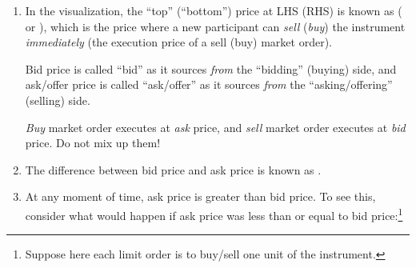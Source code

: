 \begin{enumerate}
\item In the visualization, the ``top'' (``bottom'') price at LHS (RHS) is
known as  ( or ), which is
the price where a new participant  can \emph{sell} (\emph{buy}) the
instrument \emph{immediately} (the execution price of a sell (buy) market
order).

\begin{note}
Bid price is called ``bid'' as it sources \emph{from} the ``bidding'' (buying)
side, and ask/offer price is called ``ask/offer'' as it sources \emph{from} the
``asking/offering'' (selling) side.
\end{note}

\begin{warning}
\emph{Buy} market order executes at \emph{ask} price, and \emph{sell} market
order executes at \emph{bid} price. Do not mix up them!
\end{warning}

\item The difference between bid price and ask price is known as .

\item At any moment of time, ask price is greater than bid price. To see this,
consider what would happen if ask price was less than or equal to bid
price:\footnote{Suppose here each limit order is to buy/sell one unit of the
instrument.}
\begin{center}
\end{center}
\end{enumerate}

